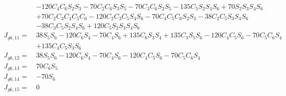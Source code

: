 \documentclass[12pt]{article}
\begin{document}
\begin{CJK}{UTF8}{bsmi}
\begin{equation*}
\begin{split}
			  & - 120C_4C_6S_2S_3 - 70C_2C_6S_3S_5 - 70C_3C_6S_2S_5 - 135C_5S_2S_4S_6 + 70S_2S_3S_4S_6\\
			  & + 70C_2C_3C_4C_5C_6 - 120C_2C_3C_5S_4S_6 - 70C_4C_5C_6S_2S_3 - 38C_2C_5S_3S_4S_6\\
			  & - 38C_3C_5S_2S_4S_6 + 120C_5S_2S_3S_4S_6\\
J_{g6,11} =\  &38S_5S_6 - 120C_6S_4 - 70C_4S_6 + 135C_6S_3S_4 + 135C_3S_5S_6 - 120C_4C_5S_6 - 70C_5C_6S_4\\
			  & + 135C_4C_5S_3S_6\\
J_{g6,12} =\  &38S_5S_6 - 120C_6S_4 - 70C_4S_6 - 120C_4C_5S_6 - 70C_5C_6S_4\\
J_{g6,13} =\  &70C_6S_5\\
J_{g6,14} =\  &-70S_6\\
J_{g6,15} =\  &0\\
\end{split}
\end{equation*}
\end{CJK}
\end{document}
